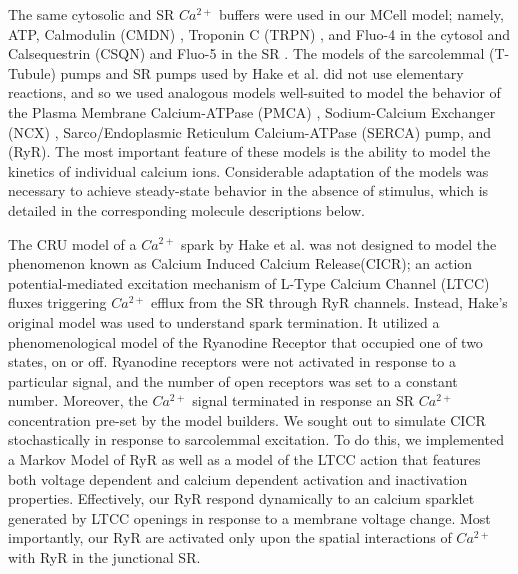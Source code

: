\documentclass[12pt]{ucsddissertation}
\begin{document}
The same cytosolic and SR $Ca^{2+}$ buffers were used in our MCell model; namely, ATP\cite{Bers2001,Picht2011,Hake2012}, Calmodulin (CMDN) \cite{Robertson1981,Fabiato1983,Michailova2002,Picht2011}, Troponin C (TRPN) \cite{Bondarenko2004}, and  Fluo-4 \cite{Picht2011} in the cytosol and Calsequestrin (CSQN)\cite{Shannon1997,Bers2001,Picht2011} and Fluo-5 in the SR \cite{Picht2011}. The models of the sarcolemmal (T-Tubule) pumps and SR pumps used by Hake et al. did not use elementary reactions, and so we used analogous models well-suited to model the behavior of the Plasma Membrane Calcium-ATPase (PMCA) \cite{Penheiter2003,Brini2009,Bartol2015}, Sodium-Calcium Exchanger (NCX) \cite{Hilgemann1991,Bartol2015}, Sarco/Endoplasmic Reticulum Calcium-ATPase (SERCA) pump\cite{Higgins2006,Bartol2015}, and (RyR)\cite{Saftenku2001}. The most important feature of these models is the ability to model the kinetics of individual calcium ions. Considerable adaptation of the models was necessary to achieve steady-state behavior in the absence of stimulus, which is detailed in the corresponding molecule descriptions below.

The CRU model of a $Ca^{2+}$ spark by Hake et al. \cite{Hake2012} was not designed to model the phenomenon known as Calcium Induced Calcium Release(CICR); an action potential-mediated excitation mechanism of L-Type Calcium Channel (LTCC) fluxes triggering $Ca^{2+}$ efflux from the SR through RyR channels. Instead, Hake's original model was used to understand spark termination. It utilized a phenomenological model of the Ryanodine Receptor that occupied one of two states, on or off. Ryanodine receptors were not activated in response to a particular signal, and the number of open receptors was set to a constant number. Moreover, the $Ca^{2+}$ signal terminated in response an SR $Ca^{2+}$ concentration pre-set by the model builders. We sought out to simulate CICR stochastically in response to sarcolemmal excitation. To do this, we implemented a Markov Model of RyR \cite{Saftenku2001} as well as a model of the LTCC action \cite{Greenstein2002} that features both voltage dependent and calcium dependent activation and inactivation properties. Effectively, our RyR respond dynamically to an calcium sparklet generated by LTCC openings in response to a membrane voltage change. Most importantly, our RyR are activated only upon the spatial interactions of $Ca^{2+}$ with RyR in the junctional SR.
\end{document}
